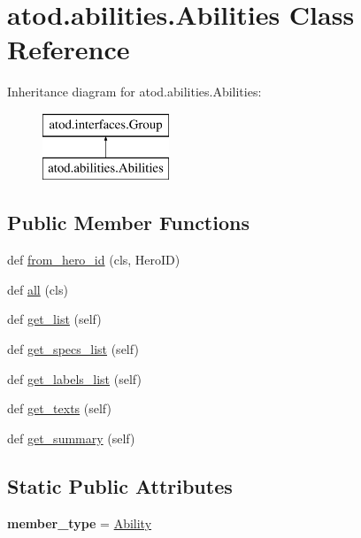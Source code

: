 \hypertarget{classatod_1_1abilities_1_1_abilities}{}\section{atod.\+abilities.\+Abilities Class Reference}
\label{classatod_1_1abilities_1_1_abilities}
Inheritance diagram for atod.\+abilities.\+Abilities\+:\begin{figure}[H]
\begin{center}
\leavevmode
\includegraphics[height=2.000000cm]{classatod_1_1abilities_1_1_abilities}
\end{center}
\end{figure}
\subsection*{Public Member Functions}
\begin{DoxyCompactItemize}
\item 
def \hyperlink{classatod_1_1abilities_1_1_abilities_a1594c605444025644a197875b8b51faa}{from\+\_\+hero\+\_\+id} (cls, Hero\+ID)
\item 
def \hyperlink{classatod_1_1abilities_1_1_abilities_a097c69ffe687d823506a74aa18efc867}{all} (cls)
\item 
def \hyperlink{classatod_1_1abilities_1_1_abilities_aa86cdc4abf4ee615197c09dfb43300ca}{get\+\_\+list} (self)
\item 
def \hyperlink{classatod_1_1abilities_1_1_abilities_a815ad0f5d36d72298f2dffeb41d3dfc3}{get\+\_\+specs\+\_\+list} (self)
\item 
def \hyperlink{classatod_1_1abilities_1_1_abilities_a2cc0448d65e22ab6d9da0a784d0276c5}{get\+\_\+labels\+\_\+list} (self)
\item 
def \hyperlink{classatod_1_1abilities_1_1_abilities_a51f21a6496e8061f58f6de24c5e74ac5}{get\+\_\+texts} (self)
\item 
def \hyperlink{classatod_1_1abilities_1_1_abilities_a332197169464ae88a9251d36989b9876}{get\+\_\+summary} (self)
\end{DoxyCompactItemize}
\subsection*{Static Public Attributes}
\begin{DoxyCompactItemize}
\item 
{\bfseries member\+\_\+type} = \hyperlink{classatod_1_1abilities_1_1_ability}{Ability}\hypertarget{classatod_1_1abilities_1_1_abilities_ac16ab1be4985ec9cda43bddd3e34cece}{}\label{classatod_1_1abilities_1_1_abilities_ac16ab1be4985ec9cda43bddd3e34cece}

\end{DoxyCompactItemize}
